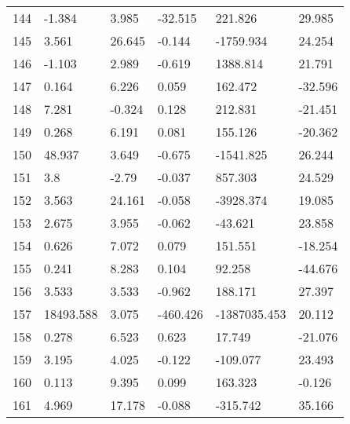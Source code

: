 \documentclass[11pt]{article}
\begin{document}
\begin{center}
\begin{longtable}{llllll}
        144 & -1.384     & 3.985                  & -32.515           & 221.826            & 29.985   \\
        145 & 3.561      & 26.645                 & -0.144            & -1759.934          & 24.254   \\
        146 & -1.103     & 2.989                  & -0.619            & 1388.814           & 21.791   \\
        147 & 0.164      & 6.226                  & 0.059             & 162.472            & -32.596  \\
        148 & 7.281      & -0.324                 & 0.128             & 212.831            & -21.451  \\
        149 & 0.268      & 6.191                  & 0.081             & 155.126            & -20.362  \\
        150 & 48.937     & 3.649                  & -0.675            & -1541.825          & 26.244   \\
        151 & 3.8        & -2.79                  & -0.037            & 857.303            & 24.529   \\
        152 & 3.563      & 24.161                 & -0.058            & -3928.374          & 19.085   \\
        153 & 2.675      & 3.955                  & -0.062            & -43.621            & 23.858   \\
        154 & 0.626      & 7.072                  & 0.079             & 151.551            & -18.254  \\
        155 & 0.241      & 8.283                  & 0.104             & 92.258             & -44.676  \\
        156 & 3.533      & 3.533                  & -0.962            & 188.171            & 27.397   \\
        157 & 18493.588  & 3.075                  & -460.426          & -1387035.453       & 20.112   \\
        158 & 0.278      & 6.523                  & 0.623             & 17.749             & -21.076  \\
        159 & 3.195      & 4.025                  & -0.122            & -109.077           & 23.493   \\
        160 & 0.113      & 9.395                  & 0.099             & 163.323            & -0.126   \\
        161 & 4.969      & 17.178                 & -0.088            & -315.742           & 35.166   \\

\end{longtable}
\end{center}
\end{document}
